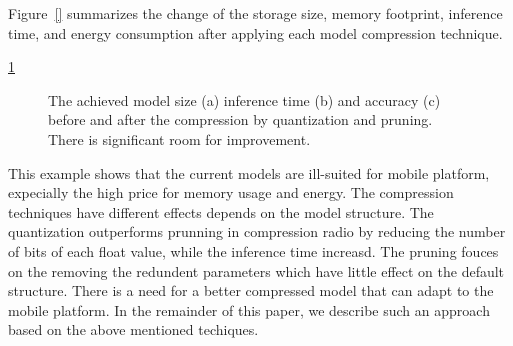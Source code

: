Figure~\ref{} summarizes the change of the storage size, memory footprint, inference time, and energy consumption after applying each model
compression technique.

\ref{fig:motivation}

\begin{figure}[!t]
\centering
{}
\hfill
{}
\hfill

\caption{The achieved model size (a) inference time (b) and accuracy (c) before and after the compression by quantization and pruning.
There is significant room for improvement.}
\label{fig:motivation}
\end{figure}

This example shows that the current models are ill-suited for mobile platform,
expecially the high price for memory usage and energy.
The compression techniques have different effects depends on the model
structure.
The quantization outperforms prunning in compression radio by
reducing the number of bits of each float value, while the inference time increasd.
The pruning fouces on the removing the redundent parameters which have little effect
on the default structure.
There is a need for a better compressed
model that can adapt to the mobile platform. In the remainder of this
paper, we describe such an approach based on the above mentioned techiques.




